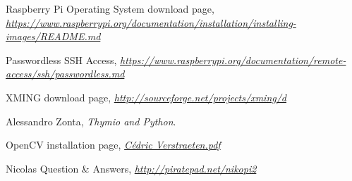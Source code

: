 \documentclass[12pt]{article}%
\begin{document}
\begin{thebibliography}{9}

	Raspberry Pi Operating System download page,
	\emph{\url{https://www.raspberrypi.org/documentation/installation/installing-images/README.md}}
	
	Passwordless SSH Access,
	\emph{\url{https://www.raspberrypi.org/documentation/remote-access/ssh/passwordless.md}}
	
	XMING download page,
	\emph{\url{http://sourceforge.net/projects/xming/d}}
	
	
	Alessandro Zonta,
	\emph{Thymio and Python}.
	
	OpenCV installation page,
	\emph{\url{Cédric Verstraeten.pdf}}
	
	Nicolas Question \& Answers,
	\emph{\url{http://piratepad.net/nikopi2}}
	
	
\end{thebibliography}
\end{document}
